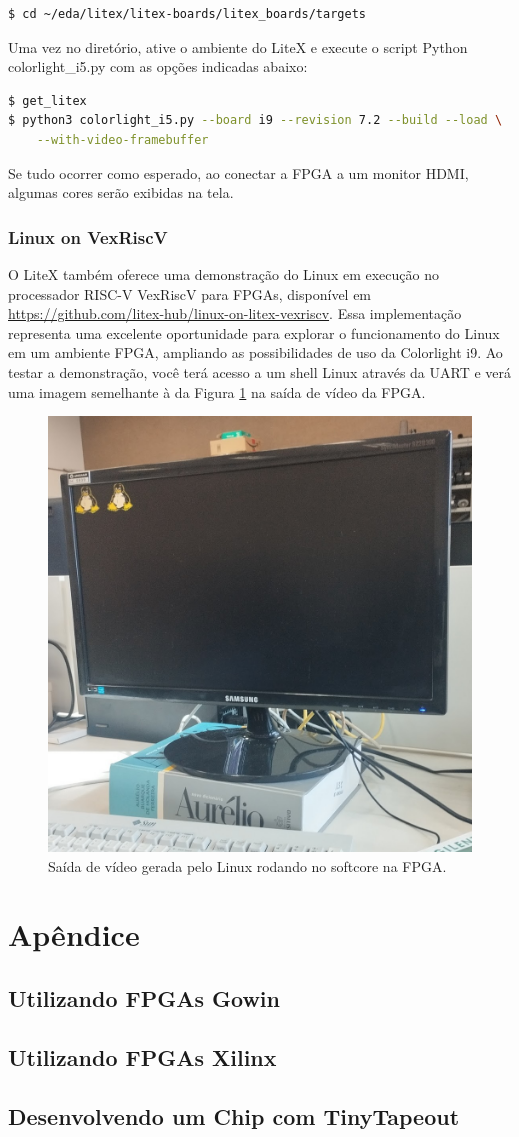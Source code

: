 \documentclass{report}
\begin{document}
\begin{lstlisting}[language=bash]
$ cd ~/eda/litex/litex-boards/litex_boards/targets
\end{lstlisting}

Uma vez no diretório, ative o ambiente do LiteX e execute o script Python colorlight\_i5.py com as opções indicadas abaixo:

\begin{lstlisting}[language=bash]
$ get_litex
$ python3 colorlight_i5.py --board i9 --revision 7.2 --build --load \
    --with-video-framebuffer
\end{lstlisting}

Se tudo ocorrer como esperado, ao conectar a FPGA a um monitor HDMI, algumas cores serão exibidas na tela.

\subsection{Linux on VexRiscV}

O LiteX também oferece uma demonstração do Linux em execução no processador RISC-V VexRiscV para FPGAs, disponível em \url{https://github.com/litex-hub/linux-on-litex-vexriscv}. Essa implementação representa uma excelente oportunidade para explorar o funcionamento do Linux em um ambiente FPGA, ampliando as possibilidades de uso da Colorlight i9. Ao testar a demonstração, você terá acesso a um shell Linux através da UART e verá uma imagem semelhante à da Figura \ref{fig:linux_on_vexriscv} na saída de vídeo da FPGA.

\begin{figure}[H]
    \centering
    \includegraphics[width=0.5\linewidth]{linux_on_vexriscv.jpg}
    \caption{Saída de vídeo gerada pelo Linux rodando no softcore na FPGA.}
    \label{fig:linux_on_vexriscv}
\end{figure}


\chapter{Apêndice}

\section{Utilizando FPGAs Gowin}

\section{Utilizando FPGAs Xilinx}

\section{Desenvolvendo um Chip com TinyTapeout}
\end{document}
